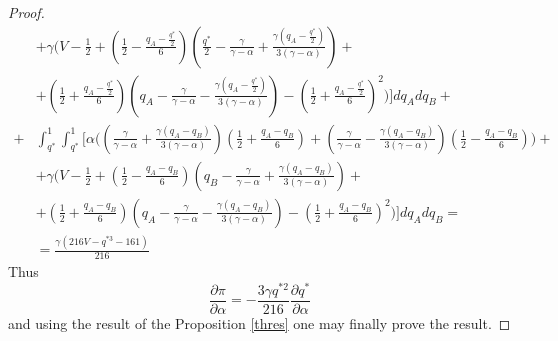 \documentclass[a4paper]{article}
\begin{document}
\begin{proof}
\begin{align*}
		&+\gamma \biggl(V - \frac{1}{2} + \left(\frac{1}{2} - \frac{q_A-\frac{q^*}{2}}{6} \right) \left( \frac{q^*}{2} - \frac{\gamma}{\gamma - \alpha} + \frac{\gamma \left(q_A -  \frac{q^*}{2} \right)}{3 (\gamma - \alpha)} \right)  + \\
		&+ \left(\frac{1}{2} + \frac{q_A-\frac{q^*}{2}}{6} \right) \left(q_A - \frac{\gamma}{\gamma - \alpha} - \frac{\gamma \left(q_A- \frac{q^*}{2} \right)}{3(\gamma - \alpha)} \right)  - \left( \frac{1}{2} + \frac{q_A - \frac{q^*}{2}}{6} \right)^2 \biggr)  \biggr] dq_A dq_B + \\
		+
		&\int_{q^*}^{1} \int_{q^*}^{1} \biggl[ \alpha \biggl( \left( \frac{\gamma}{\gamma - \alpha} + \frac{\gamma\left(q_A - q_B \right) }{3(\gamma - \alpha)} \right)\left(\frac{1}{2} + \frac{q_A - q_B}{6} \right) + \left( \frac{\gamma}{\gamma - \alpha} - \frac{\gamma\left(q_A- q_B \right) }{3(\gamma - \alpha)} \right)\left(\frac{1}{2} - \frac{q_A -q_B}{6} \right) \biggr)+\\
		&+\gamma \biggl(V - \frac{1}{2} + \left(\frac{1}{2} - \frac{q_A-q_B}{6} \right) \left( q_B - \frac{\gamma}{\gamma - \alpha} + \frac{\gamma \left(q_A -  q_B \right)}{3 (\gamma - \alpha)} \right)  + \\
		&+ \left(\frac{1}{2} + \frac{q_A-q_B}{6} \right) \left(q_A - \frac{\gamma}{\gamma - \alpha} - \frac{\gamma \left(q_A- q_B \right)}{3(\gamma - \alpha)} \right)  - \left( \frac{1}{2} + \frac{q_A - q_B}{6} \right)^2 \biggr)  \biggr] dq_A dq_B = \\
		& = \frac{\gamma(216 V - q^{*3} - 161)}{216}
		\end{align*}
		Thus $$\frac{\partial \pi}{\partial \alpha} = -\frac{3 \gamma q^{*2}}{216} \frac{\partial q^*}{\partial \alpha}$$ and using the result of the Proposition \ref{thres} one may finally prove the result.
	\end{proof}
	{}
	
\end{document}
